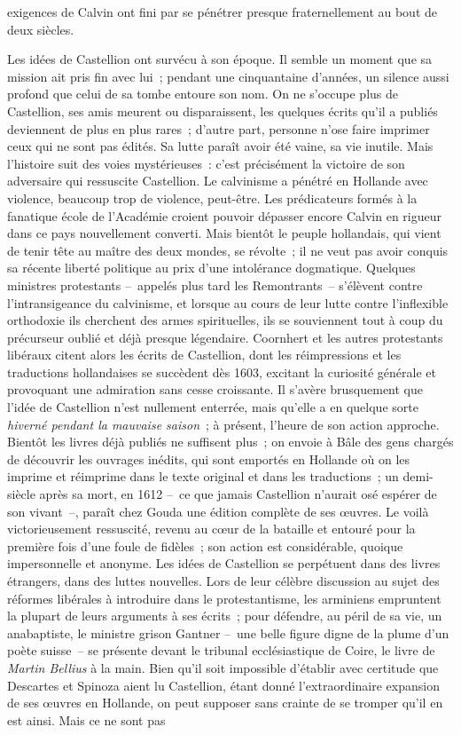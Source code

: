 \documentclass[french,twoside]{book} %
\newcommand{\astermono}{\medskip\centerline{\color{rubric}\large\selectfont{\syms ✻}}\medskip\par}%
\begin{document}
exigences de Calvin ont fini par se pénétrer presque fraternellement au bout de deux siècles.\par

\astermono

\noindent Les idées de Castellion ont survécu à son époque. Il semble un moment que sa mission ait pris fin avec lui ; pendant une cinquantaine d’années, un silence aussi profond que celui de sa tombe entoure son nom. On ne s’occupe plus de Castellion, ses amis meurent ou disparaissent, les quelques écrits qu’il a publiés deviennent de plus en plus rares ; d’autre part, personne n’ose faire imprimer ceux qui ne sont pas édités. Sa lutte paraît avoir été vaine, sa vie inutile. Mais l’histoire suit des voies mystérieuses : c’est précisément la victoire de son adversaire qui ressuscite Castellion. Le calvinisme a pénétré en Hollande avec violence, beaucoup trop de violence, peut-être. Les prédicateurs formés à la fanatique école de l’Académie croient pouvoir dépasser encore Calvin en rigueur dans ce pays nouvellement converti. Mais bientôt le peuple hollandais, qui vient de tenir tête au maître des deux mondes, se révolte ; il ne veut pas avoir conquis sa récente liberté politique au prix d’une intolérance dogmatique. Quelques ministres protestants – appelés plus tard les Remontrants – s’élèvent contre l’intransigeance du calvinisme, et lorsque au cours de leur lutte contre l’inflexible orthodoxie ils cherchent des armes spirituelles, ils se souviennent tout à coup du précurseur oublié et déjà presque légendaire. Coornhert et les autres protestants libéraux citent alors les écrits de Castellion, dont les réimpressions et les traductions hollandaises se succèdent dès 1603, excitant la curiosité générale et provoquant une admiration sans cesse croissante. Il s’avère brusquement que l’idée de Castellion n’est nullement enterrée, mais qu’elle a en quelque sorte \emph{hiverné pendant la mauvaise saison} ; à présent, l’heure de son action approche. Bientôt les livres déjà publiés ne suffisent plus ; on envoie à Bâle des gens chargés de découvrir les ouvrages inédits, qui sont emportés en Hollande où on les imprime et réimprime dans le texte original et dans les traductions ; un demi-siècle après sa mort, en 1612 – ce que jamais Castellion n’aurait osé espérer de son vivant –, paraît chez Gouda une édition complète de ses œuvres. Le voilà victorieusement ressuscité, revenu au cœur de la bataille et entouré pour la première fois d’une foule de fidèles ; son action est considérable, quoique impersonnelle et anonyme. Les idées de Castellion se perpétuent dans des livres étrangers, dans des luttes nouvelles. Lors de leur célèbre discussion au sujet des réformes libérales à introduire dans le protestantisme, les arminiens empruntent la plupart de leurs arguments à ses écrits ; pour défendre, au péril de sa vie, un anabaptiste, le ministre grison Gantner – une belle figure digne de la plume d’un poète suisse – se présente devant le tribunal ecclésiastique de Coire, le livre de \emph{Martin Bellius} à la main. Bien qu’il soit impossible d’établir avec certitude que Descartes et Spinoza aient lu Castellion, étant donné l’extraordinaire expansion de ses œuvres en Hollande, on peut supposer sans crainte de se tromper qu’il en est ainsi. Mais ce ne sont pas 
\end{document}
